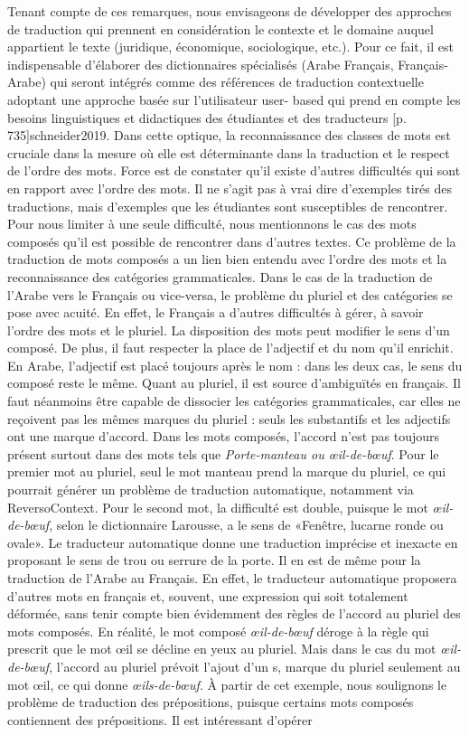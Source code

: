 \documentclass{textolivre}
\begin{document}
Tenant compte de ces remarques, nous envisageons de développer des approches de traduction qui prennent en considération le contexte et le domaine auquel appartient le texte (juridique, économique, sociologique, etc.). Pour ce fait, il est indispensable d’élaborer des dictionnaires spécialisés (Arabe Français, Français-Arabe) qui seront intégrés comme des références de traduction contextuelle adoptant une approche basée sur l’utilisateur user- based qui prend en compte les besoins linguistiques et didactiques des étudiantes et des traducteurs [p. 735]{schneider2019}. Dans cette optique, la reconnaissance des classes de mots est cruciale dans la mesure où elle est déterminante dans la traduction et le respect de l’ordre des mots. Force est de constater qu’il existe d’autres difficultés qui sont en rapport avec l’ordre des mots. Il ne s’agit pas à vrai dire d’exemples tirés des traductions, mais d’exemples que les étudiantes sont susceptibles de rencontrer. Pour nous limiter à une seule difficulté, nous mentionnons le cas des mots composés qu’il est possible de rencontrer dans d’autres textes. Ce problème de la traduction de mots composés a un lien bien entendu avec l’ordre des mots et la reconnaissance des catégories grammaticales. Dans le cas de la traduction de l’Arabe vers le Français ou vice-versa, le problème du pluriel et des catégories se pose avec acuité. En effet, le Français a d’autres difficultés à gérer, à savoir l’ordre des mots et le pluriel. La disposition des mots peut modifier le sens d’un composé. De plus, il faut respecter la place de l’adjectif et du nom qu’il enrichit. En Arabe, l’adjectif est placé toujours après le nom : dans les deux cas, le sens du composé reste le même. Quant au pluriel, il est source d’ambiguïtés en français. Il faut néanmoins être capable de dissocier les catégories grammaticales, car elles ne reçoivent pas les mêmes marques du pluriel : seuls les substantifs et les adjectifs ont une marque d’accord. Dans les mots composés, l’accord n’est pas toujours présent surtout dans des mots tels que \textit{Porte-manteau ou œil-de-bœuf}. Pour le premier mot au pluriel, seul le mot manteau prend la marque du pluriel, ce qui pourrait générer un problème de traduction automatique, notamment via ReversoContext. Pour le second mot, la difficulté est double, puisque le mot \textit{œil-de-bœuf}, selon le dictionnaire Larousse, a le sens de «Fenêtre, lucarne ronde ou ovale». Le traducteur automatique donne une traduction imprécise et inexacte en proposant le sens de trou ou serrure de la porte. Il en est de même pour la traduction de l’Arabe au Français. En effet, le traducteur automatique proposera d’autres mots en français et, souvent, une expression qui soit totalement déformée, sans tenir compte bien évidemment des règles de l’accord au pluriel des mots composés. En réalité, le mot composé \textit{œil-de-bœuf} déroge à la règle qui prescrit que le mot œil se décline en yeux au pluriel. Mais dans le cas du mot \textit{œil-de-bœuf}, l’accord au pluriel prévoit l’ajout d’un s, marque du pluriel seulement au mot œil, ce qui donne \textit{œils-de-bœuf}. À partir de cet exemple, nous soulignons le problème de traduction des prépositions, puisque certains mots composés contiennent des prépositions. Il est intéressant d’opérer 
\end{document}
